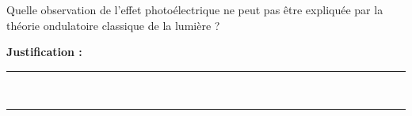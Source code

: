 Quelle observation de l'effet photoélectrique ne peut pas être expliquée par la théorie ondulatoire classique de la lumière ?

\choices

\noindent\textbf{Justification :} \hrulefill \\[2.5ex]
\rule{\linewidth}{0.4pt} \\[2.5ex]
\rule{\linewidth}{0.4pt}
\vfill
